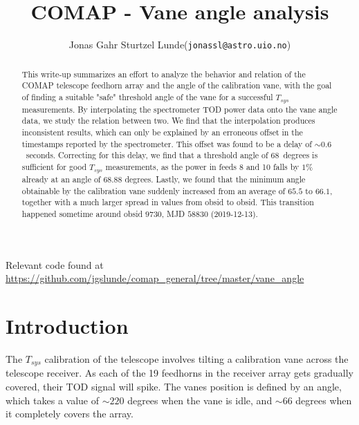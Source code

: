 \documentclass[10pt, a4paper]{article}
\begin{document}
\title{COMAP - Vane angle analysis}
\author{
    \begin{tabular}{r l}
        Jonas Gahr Sturtzel Lunde & (\texttt{jonassl@astro.uio.no})
    \end{tabular}}
\maketitle
Relevant code found at \url{https://github.com/jgslunde/comap_general/tree/master/vane_angle}
\vspace{0.7cm}


\renewcommand{\abstractname}{Summary}
\begin{abstract}
    \noindent
    This write-up summarizes an effort to analyze the behavior and relation of the COMAP telescope feedhorn array and the angle of the calibration vane, with the goal of finding a suitable "safe" threshold angle of the vane for a successful $T_{sys}$ measurements. By interpolating the spectrometer TOD power data onto the vane angle data, we study the relation between two. We find that the interpolation produces inconsistent results, which can only be explained by an erroneous offset in the timestamps reported by the spectrometer. This offset was found to be a delay of $\sim 0.6$ seconds. Correcting for this delay, we find that a threshold angle of $68$ degrees is sufficient for good $T_{sys}$ measurements, as the power in feeds 8 and 10 falls by $1\%$ already at an angle of $68.88$ degrees. Lastly, we found that the minimum angle obtainable by the calibration vane suddenly increased from an average of $65.5$ to $66.1$, together with a much larger spread in values from obsid to obsid. This transition happened sometime around obsid $9730$, MJD $58830$ (2019-12-13).
\end{abstract}




\section{Introduction}
The $T_{sys}$ calibration of the telescope involves tilting a calibration vane across the telescope receiver. As each of the 19 feedhorns in the receiver array gets gradually covered, their TOD signal will spike. The vanes position is defined by an angle, which takes a value of $\sim 220$ degrees when the vane is idle, and $\sim 66$ degrees when it completely covers the array.
\end{document}

